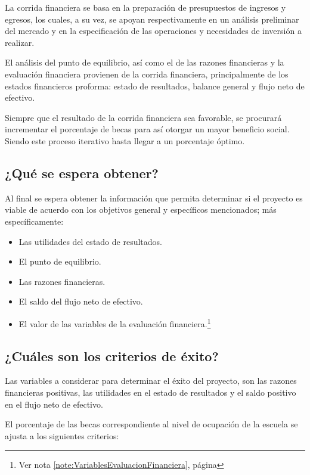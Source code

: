 La corrida financiera se basa en la preparación de presupuestos de ingresos y egresos, los cuales, a su vez, se apoyan respectivamente en un análisis preliminar del mercado y en la especificación de las operaciones y necesidades de inversión a realizar. 

El análisis del punto de equilibrio, así como el de las razones financieras y la evaluación financiera provienen de la corrida financiera, principalmente de los estados financieros proforma: estado de resultados, balance general y flujo neto de efectivo.

Siempre que el resultado de la corrida financiera sea favorable, se procurará incrementar el porcentaje de becas para así otorgar un mayor beneficio social. Siendo este proceso iterativo hasta llegar a un porcentaje óptimo.

\subsection{¿Qué se espera obtener?}

Al final se espera obtener la información que permita determinar si el proyecto es viable de acuerdo con los objetivos general y específicos mencionados; más específicamente:

\begin{itemize}
	\item Las utilidades del estado de resultados.
	\item El punto de equilibrio.
	\item Las razones financieras.
	\item El saldo del flujo neto de efectivo.
	\item El valor de las variables de la evaluación financiera.\footnote{Ver nota \ref{note:VariablesEvaluacionFinanciera}, página \pageref{note:VariablesEvaluacionFinanciera}}
\end{itemize}

\subsection{¿Cuáles son los criterios de éxito?}
\label{sub:Intro:CriteriosExito}

Las variables a considerar para determinar el éxito del proyecto, son las razones financieras positivas, las utilidades en el estado de resultados y el saldo positivo en el flujo neto de efectivo.

El porcentaje de las becas correspondiente al nivel de ocupación de la escuela se ajusta a los siguientes criterios:

